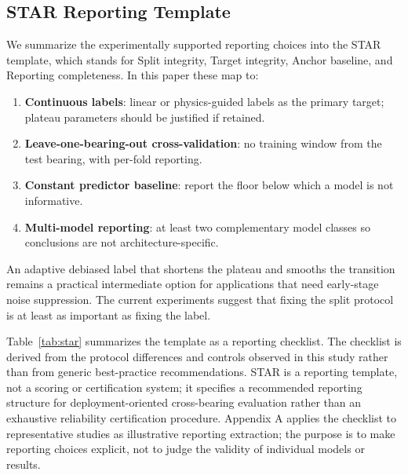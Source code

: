 \documentclass[pdflatex,sn-mathphys-num]{sn-jnl}
\begin{document}
\subsection{STAR Reporting Template}
We summarize the experimentally supported reporting choices into the STAR template, which stands for Split integrity, Target integrity, Anchor baseline, and Reporting completeness. In this paper these map to:
\begin{enumerate}
    \item \textbf{Continuous labels}: linear or physics-guided labels as the primary target; plateau parameters should be justified if retained.
    \item \textbf{Leave-one-bearing-out cross-validation}: no training window from the test bearing, with per-fold reporting.
    \item \textbf{Constant predictor baseline}: report the floor below which a model is not informative.
    \item \textbf{Multi-model reporting}: at least two complementary model classes so conclusions are not architecture-specific.
\end{enumerate}
An adaptive debiased label that shortens the plateau and smooths the transition remains a practical intermediate option for applications that need early-stage noise suppression. The current experiments suggest that fixing the split protocol is at least as important as fixing the label.

Table~\ref{tab:star} summarizes the template as a reporting checklist. The checklist is derived from the protocol differences and controls observed in this study rather than from generic best-practice recommendations. STAR is a reporting template, not a scoring or certification system; it specifies a recommended reporting structure for deployment-oriented cross-bearing evaluation rather than an exhaustive reliability certification procedure. Appendix A applies the checklist to representative studies as illustrative reporting extraction; the purpose is to make reporting choices explicit, not to judge the validity of individual models or results.

\begin{table}[t]
\centering
\caption{STAR reporting structure recommended for deployment-oriented cross-bearing evaluation.}
\label{tab:star}
\small
{}
\end{table}
\end{document}
